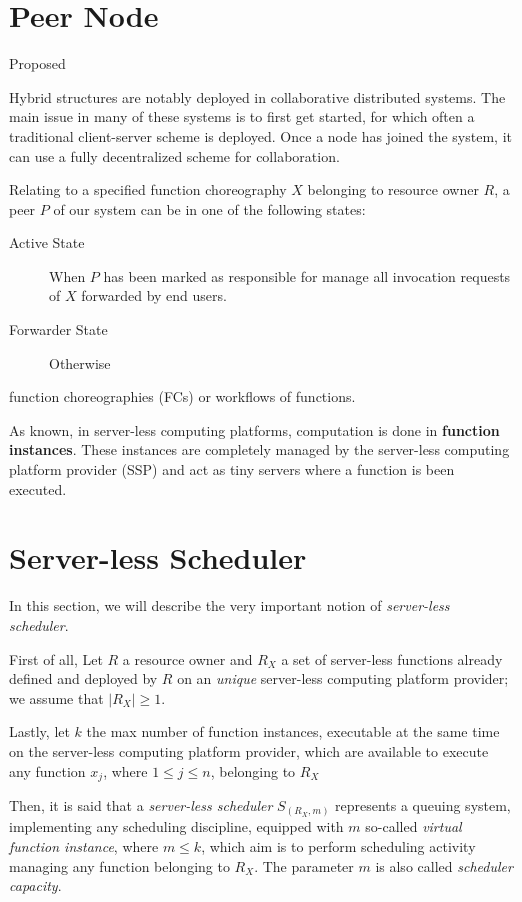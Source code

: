 \documentclass[10pt,a4paper]{article}
\begin{document}
\section{Peer Node}

Proposed 

Hybrid structures are notably deployed in collaborative distributed systems.
The main issue in many of these systems is to first get started, for which often
a traditional client-server scheme is deployed. Once a node has joined the
system, it can use a fully decentralized scheme for collaboration.


Relating to a specified function choreography $X$ belonging to resource owner $R$, a peer $P$ of our system can be in one of the following states:

\begin{description}
\item[Active State] When $P$ has been marked as responsible for manage all invocation requests of $X$ forwarded by end users.
\item[Forwarder State] Otherwise
\end{description}


function choreographies (FCs) or workflows of
functions. 

As known, in server-less computing platforms, computation is done in \textbf{function instances}. These instances are completely managed by the server-less computing platform provider (SSP) and act as tiny servers where a function is been executed.

\section{Server-less Scheduler}

In this section, we will describe the very important notion of \textit{server-less scheduler}.

First of all, Let $R$ a resource owner and $R_{X}$ a set of server-less functions already defined and deployed by $R$ on an \textit{unique} server-less computing platform provider; we assume that $|R_{X}| \geq 1$.

Lastly, let $k$ the max number of function instances, executable at the same time on the server-less computing platform provider, which are available to execute any function $x_j$, where $1 \leq j \leq n$, belonging to $R_{X}$

Then, it is said that a \textit{server-less scheduler} $S_{({R_{X}},m)}$ represents a queuing system, implementing any scheduling discipline, equipped with $m$ so-called \textit{virtual function instance}, where $m \leq k$, which aim is to perform scheduling activity managing any function belonging to $R_{X}$. The parameter $m$ is also called \textit{scheduler capacity}.
\end{document}
